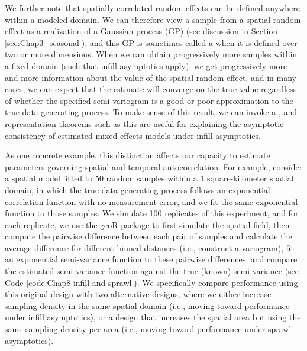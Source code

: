 We further note that spatially correlated random effects can be defined anywhere within a modeled domain.  We can therefore view a sample from a spatial random effect as a realization of a Gaussian process (GP) (see discussion in Section \ref{sec:Chap3_seasonal}), and this GP is sometimes called a  when it is defined over two or more dimensions.  When we can obtain progressively more samples within a fixed domain (such that infill asymptotics apply), we get progressively more and more information about the value of the spatial random effect, and in many cases, we can expect that the estimate will converge on the true value regardless of whether the specified semi-variogram is a good or poor approximation to the true data-generating process.  To make sense of this result, we can invoke a  \cite{klein_representation_1976}, and representation theorems such as this are useful for explaining the asymptotic consistency of estimated mixed-effects models under infill asymptotics.  

As one concrete example, this distinction affects our capacity to estimate parameters governing spatial and temporal autocorrelation.  For example, consider a spatial model fitted to 50 random samples within a 1 square-kilometer spatial domain, in which the true data-generating process follows an exponential correlation function with no measurement error, and we fit the same exponential function to those samples.  We simulate 100 replicates of this experiment, and for each replicate, we use the \colorbox{backcolour}{geoR} package \cite{ribeiro_geor_2022} to first simulate the spatial field, then compute the pairwise difference between each pair of samples and calculate the average difference for different binned distances (i.e., construct a variogram), fit an exponential semi-variance function to these pairwise differences, and compare the estimated semi-variance function against the true (known) semi-variance (see Code \ref{code:Chap8-infill-and-sprawl}).  We specifically compare performance using this original design with two alternative designs, where we either increase sampling density in the same spatial domain (i.e., moving toward performance under infill asymptotics), or a design that increases the spatial area but using the same sampling density per area (i.e., moving toward performance under sprawl asymptotics).  

\lstset{style=Rcode}


